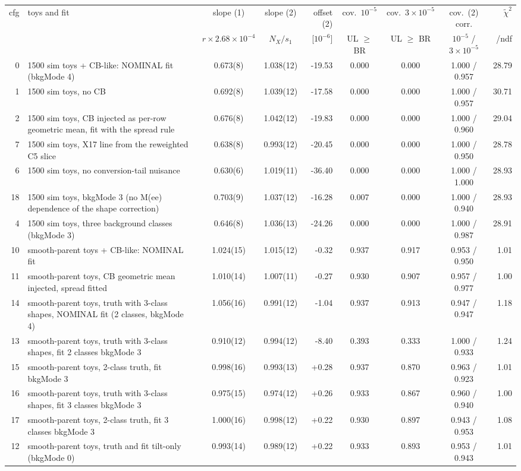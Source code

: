 \begin{tabular}{rlccrcccr}
\toprule
cfg & toys and fit & slope (1) & slope (2) & offset (2) & cov.\ $10^{-5}$ & cov.\ $3{\times}10^{-5}$ & cov.\ (2) corr. & $\tilde{\chi}^2$ \\
 & & $r\times2.68{\times}10^{-4}$ & $N_X/s_1$ & [$10^{-6}$] & UL $\ge$ BR & UL $\ge$ BR & $10^{-5}$ / $3{\times}10^{-5}$ & /ndf \\
\midrule
0 & 1500 sim toys + CB-like: NOMINAL fit (bkgMode 4) & 0.673(8) & 1.038(12) & -19.53 & 0.000 & 0.000 & 1.000 / 0.957 & 28.79 \\
1 & 1500 sim toys, no CB & 0.692(8) & 1.039(12) & -17.58 & 0.000 & 0.000 & 1.000 / 0.957 & 30.71 \\
2 & 1500 sim toys, CB injected as per-row geometric mean, fit with the spread rule & 0.676(8) & 1.042(12) & -19.83 & 0.000 & 0.000 & 1.000 / 0.960 & 29.04 \\
7 & 1500 sim toys, X17 line from the reweighted C5 slice & 0.638(8) & 0.993(12) & -20.45 & 0.000 & 0.000 & 1.000 / 0.950 & 28.78 \\
6 & 1500 sim toys, no conversion-tail nuisance & 0.630(6) & 1.019(11) & -36.40 & 0.000 & 0.000 & 1.000 / 1.000 & 28.93 \\
18 & 1500 sim toys, bkgMode 3 (no M(ee) dependence of the shape correction) & 0.703(9) & 1.037(12) & -16.28 & 0.007 & 0.000 & 1.000 / 0.940 & 28.93 \\
4 & 1500 sim toys, three background classes (bkgMode 3) & 0.646(8) & 1.036(13) & -24.26 & 0.000 & 0.000 & 1.000 / 0.987 & 28.91 \\
\midrule
10 & smooth-parent toys + CB-like: NOMINAL fit & 1.024(15) & 1.015(12) & -0.32 & 0.937 & 0.917 & 0.953 / 0.950 & 1.01 \\
11 & smooth-parent toys, CB geometric mean injected, spread fitted & 1.010(14) & 1.007(11) & -0.27 & 0.930 & 0.907 & 0.957 / 0.977 & 1.00 \\
14 & smooth-parent toys, truth with 3-class shapes, NOMINAL fit (2 classes, bkgMode 4) & 1.056(16) & 0.991(12) & -1.04 & 0.937 & 0.913 & 0.947 / 0.947 & 1.18 \\
13 & smooth-parent toys, truth with 3-class shapes, fit 2 classes bkgMode 3 & 0.910(12) & 0.994(12) & -8.40 & 0.393 & 0.333 & 1.000 / 0.933 & 1.24 \\
15 & smooth-parent toys, 2-class truth, fit bkgMode 3 & 0.998(16) & 0.993(13) & +0.28 & 0.937 & 0.870 & 0.963 / 0.923 & 1.01 \\
16 & smooth-parent toys, truth with 3-class shapes, fit 3 classes bkgMode 3 & 0.975(15) & 0.974(12) & +0.26 & 0.933 & 0.867 & 0.960 / 0.940 & 1.00 \\
17 & smooth-parent toys, 2-class truth, fit 3 classes bkgMode 3 & 1.000(16) & 0.998(12) & +0.22 & 0.930 & 0.897 & 0.943 / 0.953 & 1.08 \\
12 & smooth-parent toys, truth and fit tilt-only (bkgMode 0) & 0.993(14) & 0.989(12) & +0.22 & 0.933 & 0.893 & 0.953 / 0.943 & 1.01 \\
\bottomrule
\end{tabular}
